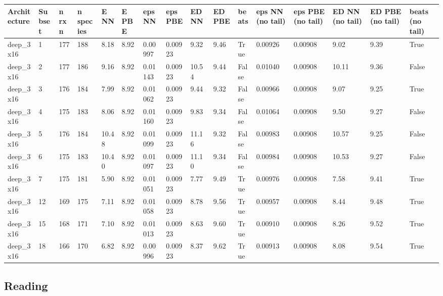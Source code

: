 \documentclass[10pt,a4paper]{article}
\begin{document}
\begin{landscape}
\begin{tiny}
\begin{longtable}{llllllllllllllll}
\toprule Architecture & Subset & n rxn & n species & E NN & E PBE & eps NN & eps PBE & ED NN & ED PBE & beats & eps NN (no tail) & eps PBE (no tail) & ED NN (no tail) & ED PBE (no tail) & beats (no tail) \\ \midrule \endhead
deep\_3x16 & 1 & 177 & 188 & 8.18 & 8.92 & 0.00997 & 0.00923 & 9.32 & 9.46 & True & 0.00926 & 0.00908 & 9.02 & 9.39 & True \\
deep\_3x16 & 2 & 177 & 186 & 9.16 & 8.92 & 0.01143 & 0.00923 & 10.54 & 9.44 & False & 0.01040 & 0.00908 & 10.11 & 9.36 & False \\
deep\_3x16 & 3 & 176 & 184 & 7.99 & 8.92 & 0.01062 & 0.00923 & 9.44 & 9.32 & False & 0.00966 & 0.00908 & 9.07 & 9.25 & True \\
deep\_3x16 & 4 & 175 & 183 & 8.06 & 8.92 & 0.01160 & 0.00923 & 9.83 & 9.34 & False & 0.01064 & 0.00908 & 9.50 & 9.27 & False \\
deep\_3x16 & 5 & 176 & 184 & 10.48 & 8.92 & 0.01099 & 0.00923 & 11.16 & 9.32 & False & 0.00983 & 0.00908 & 10.57 & 9.25 & False \\
deep\_3x16 & 6 & 175 & 183 & 10.40 & 8.92 & 0.01097 & 0.00923 & 11.10 & 9.34 & False & 0.00984 & 0.00908 & 10.53 & 9.27 & False \\
deep\_3x16 & 7 & 175 & 181 & 5.90 & 8.92 & 0.01051 & 0.00923 & 7.77 & 9.49 & True & 0.00976 & 0.00908 & 7.58 & 9.41 & True \\
deep\_3x16 & 12 & 169 & 175 & 7.11 & 8.92 & 0.01058 & 0.00923 & 8.78 & 9.56 & True & 0.00957 & 0.00908 & 8.44 & 9.48 & True \\
deep\_3x16 & 15 & 168 & 171 & 7.10 & 8.92 & 0.01013 & 0.00923 & 8.63 & 9.60 & True & 0.00910 & 0.00908 & 8.26 & 9.52 & True \\
deep\_3x16 & 18 & 166 & 170 & 6.82 & 8.92 & 0.00996 & 0.00923 & 8.37 & 9.62 & True & 0.00913 & 0.00908 & 8.08 & 9.54 & True \\
\bottomrule \end{longtable}
\end{tiny}
\end{landscape}


\subsection{Reading}
\end{document}
